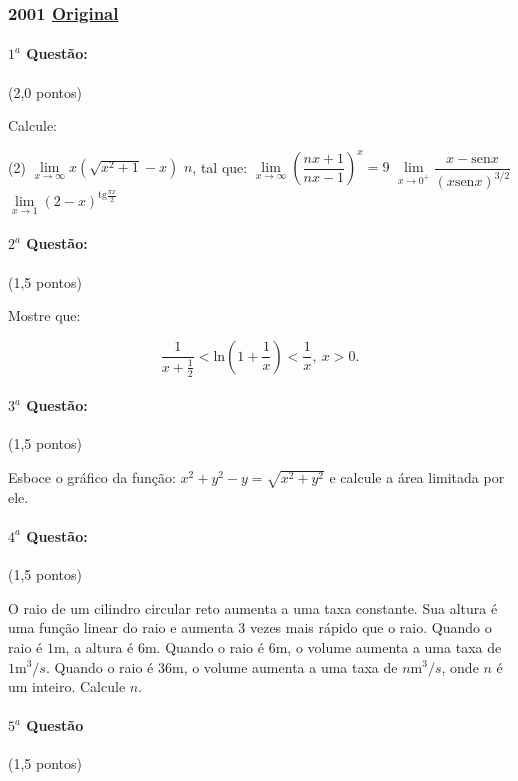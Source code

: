 \documentclass[12pt,a4paper]{article}
\newcommand{\original}[1]{\tiny \href{#1}{Original} \normalsize}
\begin{document}
\newpage

\subsubsection{2001 \original{https://drive.google.com/open?id=1conbWOg0WPp0NLASd0Nrjh41yYSqEoL5}}

\paragraph{$1^a$ Questão:} (2,0 pontos)

Calcule:

\begin{tasks}(2)
\task $\lim\limits_{x\rightarrow \infty} x(\sqrt{x^2+1}-x)$
\task $n$, tal que: $\lim\limits_{x\rightarrow \infty}\left(\dfrac{nx+1}{nx-1}\right)^x=9$
\task $\lim\limits_{x\rightarrow 0^{+}} \dfrac{x-\textrm{sen}x}{(x\textrm{sen}x)^{3/2}}$
\task $\lim\limits_{x\rightarrow 1}(2-x)^{\textrm{tg}\frac{\pi x}{2}}$
\end{tasks}

\paragraph{$2^a$ Questão:} (1,5 pontos)

Mostre que:

$$ \dfrac{1}{x+\frac{1}{2}} < \textrm{ln}(1+\dfrac{1}{x})< \dfrac{1}{x}, \ x>0. $$

\paragraph{$3^a$ Questão:} (1,5 pontos)

Esboce o gráfico da função: $x^2+y^2-y=\sqrt{x^2+y^2}$ e calcule a área limitada por ele.

\paragraph{$4^a$ Questão:} (1,5 pontos)

O raio de um cilindro circular reto aumenta a uma taxa constante. Sua altura é uma função linear do raio e aumenta 3 vezes
mais rápido que o raio. Quando o raio é $1$m, a altura é $6$m. Quando o raio é $6$m, o volume aumenta a uma taxa de $1\textrm{m}^3/s$.
Quando o raio é $36$m, o volume aumenta a uma taxa de $n\textrm{m}^3/s$, onde $n$ é um inteiro. Calcule $n$.

\paragraph{$5^a$ Questão} (1,5 pontos)
\end{document}
